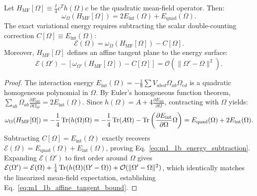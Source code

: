 \begin{theorem}
\label{thm:m1_1b_affine_tangent}
Let $H_{\mathrm{MF}}[\Omega] \equiv \frac{\ii}{4} c^T h(\Omega) c$ be the quadratic mean-field operator. Then:
\begin{equation}
\label{eq:m1_1b_double_counting_scalar}
\omega_\Omega(H_{\mathrm{MF}}[\Omega]) = 2 E_{\mathrm{int}}(\Omega) + E_{\mathrm{quad}}(\Omega).
\end{equation}
The exact variational energy requires subtracting the scalar double-counting correction $C[\Omega] \equiv E_{\mathrm{int}}(\Omega)$:
\begin{equation}
\label{eq:m1_1b_energy_subtraction}
\mathcal{E}(\Omega) = \omega_\Omega(H_{\mathrm{MF}}[\Omega]) - C[\Omega].
\end{equation}
Moreover, $H_{\mathrm{MF}}[\Omega]$ defines an affine tangent plane to the energy surface:
\begin{equation}
\label{eq:m1_1b_affine_tangent_bound}
\mathcal{E}(\Omega') - \left[ \omega_{\Omega'}(H_{\mathrm{MF}}[\Omega]) - C[\Omega] \right] = \mathcal{O}(\|\Omega' - \Omega\|^2).
\end{equation}
\end{theorem}
\begin{proof}
The interaction energy $E_{\mathrm{int}}(\Omega) = -\frac{1}{8}\sum V_{abcd}\Omega_{ab}\Omega_{cd}$ is a quadratic homogeneous polynomial in $\Omega$. By Euler's homogeneous function theorem, $\sum_{ab}\Omega_{ab}\frac{\partial E_{\mathrm{int}}}{\partial \Omega_{ab}} = 2 E_{\mathrm{int}}(\Omega)$. Since $h(\Omega) = A + 4 \frac{\partial E_{\mathrm{int}}}{\partial \Omega}$, contracting with $\Omega$ yields:
\begin{equation}
\omega_\Omega(H_{\mathrm{MF}}[\Omega]) = -\frac{1}{4}\operatorname{Tr}(h(\Omega)\Omega) = -\frac{1}{4}\operatorname{Tr}(A\Omega) - \operatorname{Tr}\left(\frac{\partial E_{\mathrm{int}}}{\partial \Omega}\Omega\right) = E_{\mathrm{quad}}(\Omega) + 2 E_{\mathrm{int}}(\Omega).
\end{equation}
Subtracting $C[\Omega] = E_{\mathrm{int}}(\Omega)$ exactly recovers $\mathcal{E}(\Omega) = E_{\mathrm{quad}}(\Omega) + E_{\mathrm{int}}(\Omega)$, proving Eq.~\eqref{eq:m1_1b_energy_subtraction}. Expanding $\mathcal{E}(\Omega')$ to first order around $\Omega$ gives $\mathcal{E}(\Omega') = \mathcal{E}(\Omega) + \frac{1}{4}\operatorname{Tr}(h(\Omega)(\Omega' - \Omega)) + \mathcal{O}(\|\Omega'-\Omega\|^2)$, which identically matches the linearized mean-field expectation, establishing Eq.~\eqref{eq:m1_1b_affine_tangent_bound}.
\end{proof}

